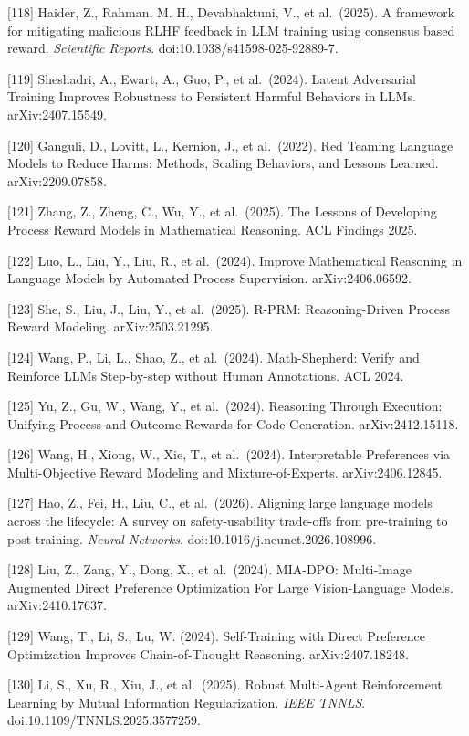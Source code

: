 {[}118{]} Haider, Z., Rahman, M. H., Devabhaktuni, V., et al.~(2025). A framework for mitigating malicious RLHF feedback in LLM training using consensus based reward. \emph{Scientific Reports}. doi:10.1038/s41598-025-92889-7.

{[}119{]} Sheshadri, A., Ewart, A., Guo, P., et al.~(2024). Latent Adversarial Training Improves Robustness to Persistent Harmful Behaviors in LLMs. arXiv:2407.15549.

{[}120{]} Ganguli, D., Lovitt, L., Kernion, J., et al.~(2022). Red Teaming Language Models to Reduce Harms: Methods, Scaling Behaviors, and Lessons Learned. arXiv:2209.07858.

{[}121{]} Zhang, Z., Zheng, C., Wu, Y., et al.~(2025). The Lessons of Developing Process Reward Models in Mathematical Reasoning. ACL Findings 2025.

{[}122{]} Luo, L., Liu, Y., Liu, R., et al.~(2024). Improve Mathematical Reasoning in Language Models by Automated Process Supervision. arXiv:2406.06592.

{[}123{]} She, S., Liu, J., Liu, Y., et al.~(2025). R-PRM: Reasoning-Driven Process Reward Modeling. arXiv:2503.21295.

{[}124{]} Wang, P., Li, L., Shao, Z., et al.~(2024). Math-Shepherd: Verify and Reinforce LLMs Step-by-step without Human Annotations. ACL 2024.

{[}125{]} Yu, Z., Gu, W., Wang, Y., et al.~(2024). Reasoning Through Execution: Unifying Process and Outcome Rewards for Code Generation. arXiv:2412.15118.

{[}126{]} Wang, H., Xiong, W., Xie, T., et al.~(2024). Interpretable Preferences via Multi-Objective Reward Modeling and Mixture-of-Experts. arXiv:2406.12845.

{[}127{]} Hao, Z., Fei, H., Liu, C., et al.~(2026). Aligning large language models across the lifecycle: A survey on safety-usability trade-offs from pre-training to post-training. \emph{Neural Networks}. doi:10.1016/j.neunet.2026.108996.

{[}128{]} Liu, Z., Zang, Y., Dong, X., et al.~(2024). MIA-DPO: Multi-Image Augmented Direct Preference Optimization For Large Vision-Language Models. arXiv:2410.17637.

{[}129{]} Wang, T., Li, S., Lu, W. (2024). Self-Training with Direct Preference Optimization Improves Chain-of-Thought Reasoning. arXiv:2407.18248.

{[}130{]} Li, S., Xu, R., Xiu, J., et al.~(2025). Robust Multi-Agent Reinforcement Learning by Mutual Information Regularization. \emph{IEEE TNNLS}. doi:10.1109/TNNLS.2025.3577259.

